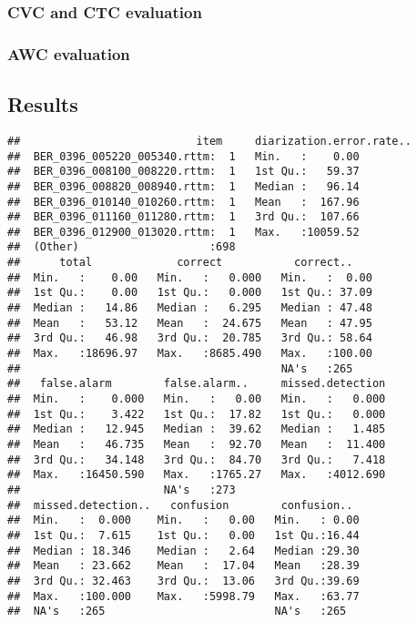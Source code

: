 \documentclass[english,floatsintext,man]{apa6}
\begin{document}
\subsubsection{CVC and CTC evaluation}\label{cvc-and-ctc-evaluation}

\subsubsection{AWC evaluation}\label{awc-evaluation}

\subsection{Results}\label{results}

\begin{verbatim}
##                           item     diarization.error.rate..
##  BER_0396_005220_005340.rttm:  1   Min.   :    0.00        
##  BER_0396_008100_008220.rttm:  1   1st Qu.:   59.37        
##  BER_0396_008820_008940.rttm:  1   Median :   96.14        
##  BER_0396_010140_010260.rttm:  1   Mean   :  167.96        
##  BER_0396_011160_011280.rttm:  1   3rd Qu.:  107.66        
##  BER_0396_012900_013020.rttm:  1   Max.   :10059.52        
##  (Other)                    :698                           
##      total             correct           correct..     
##  Min.   :    0.00   Min.   :   0.000   Min.   :  0.00  
##  1st Qu.:    0.00   1st Qu.:   0.000   1st Qu.: 37.09  
##  Median :   14.86   Median :   6.295   Median : 47.48  
##  Mean   :   53.12   Mean   :  24.675   Mean   : 47.95  
##  3rd Qu.:   46.98   3rd Qu.:  20.785   3rd Qu.: 58.64  
##  Max.   :18696.97   Max.   :8685.490   Max.   :100.00  
##                                        NA's   :265     
##   false.alarm        false.alarm..     missed.detection  
##  Min.   :    0.000   Min.   :   0.00   Min.   :   0.000  
##  1st Qu.:    3.422   1st Qu.:  17.82   1st Qu.:   0.000  
##  Median :   12.945   Median :  39.62   Median :   1.485  
##  Mean   :   46.735   Mean   :  92.70   Mean   :  11.400  
##  3rd Qu.:   34.148   3rd Qu.:  84.70   3rd Qu.:   7.418  
##  Max.   :16450.590   Max.   :1765.27   Max.   :4012.690  
##                      NA's   :273                         
##  missed.detection..   confusion        confusion..   
##  Min.   :  0.000    Min.   :   0.00   Min.   : 0.00  
##  1st Qu.:  7.615    1st Qu.:   0.00   1st Qu.:16.44  
##  Median : 18.346    Median :   2.64   Median :29.30  
##  Mean   : 23.662    Mean   :  17.04   Mean   :28.39  
##  3rd Qu.: 32.463    3rd Qu.:  13.06   3rd Qu.:39.69  
##  Max.   :100.000    Max.   :5998.79   Max.   :63.77  
##  NA's   :265                          NA's   :265
\end{verbatim}
\end{document}
